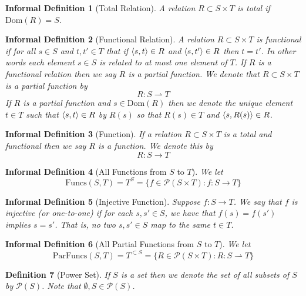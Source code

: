 \documentclass[12pt]{article}
\theoremstyle{break}
\newtheorem{definition}{Definition}[section]
\theoremstyle{break}
\theoremstyle{break}
\theoremstyle{break}
\theoremstyle{break}
\newtheorem{informal definition}[definition]{Informal Definition}
\theoremstyle{break}
\newtheorem{informal theorem}[theorem]{Informal Theorem}
\newcommand{\mc}[1]{\mathcal{#1}}
\begin{document}
	\begin{informal definition}[Total Relation]
		A relation $R \subset S\times T$ is total if $\text{Dom}(R) = S$.
	\end{informal definition}
	
	
	\begin{informal definition}[Functional Relation]
		A relation $R\subset S\times T$ is functional if for all $s\in S$ and $t, t'\in T$ that if $\braket{s, t}\in R$ and $\braket{s, t'}\in R$ then $t=t'$.
		In other words each element $s\in S$ is related to \textit{at most} one element of $T$.
		If $R$ is a functional relation then we say $R$ is a partial function.
		We denote that $R \subset S\times T$ is a partial function by
		$$
		R: S \rightharpoonup T
		$$
		If $R$ is a partial function and $s \in \text{Dom}(R)$ then we denote the unique element $t\in T$ such that $\braket{s, t} \in R$ by $R(s)$ so that $R(s) \in T$ and $\braket{s, R(s)} \in R$.
	\end{informal definition}
	
	\begin{informal definition}[Function]
		If a relation $R \subset S \times T$ is a total and functional then we say $R$ is a function.
		We denote this by
		$$
		R: S\to T
		$$ 
	\end{informal definition}
	
	\begin{informal definition}[All Functions from $S$ to $T$]
		We let
		$$
		\text{Funcs}(S, T) = T^S = \{f \in \mathcal{P}(S\times T): f: S \to T\}
		$$
	\end{informal definition}
	
	\begin{informal definition}[Injective Function]
		Suppose $f: S \to T$.
		We say that $f$ is injective (or one-to-one) if for each $s, s' \in S$, we have that $f(s)=f(s')$ implies $s=s'$. 
		That is, no two $s, s'\in S$ map to the same $t\in T$.
	\end{informal definition}
	
	\begin{informal definition}[All Partial Functions from $S$ to $T$]
		We let
		$$
		\text{ParFuncs}(S, T) = T^{\subset S} =  \{R \in \mathcal{P}(S\times T): R: S \rightharpoonup T\}
		$$
	\end{informal definition}
	
	\begin{definition}[Power Set]
		If $S$ is a set then we denote the set of all subsets of $S$ by $\mc{P}(S)$.
		Note that $\emptyset, S \in \mc{P}(S)$.
	\end{definition}
	
\end{document}
